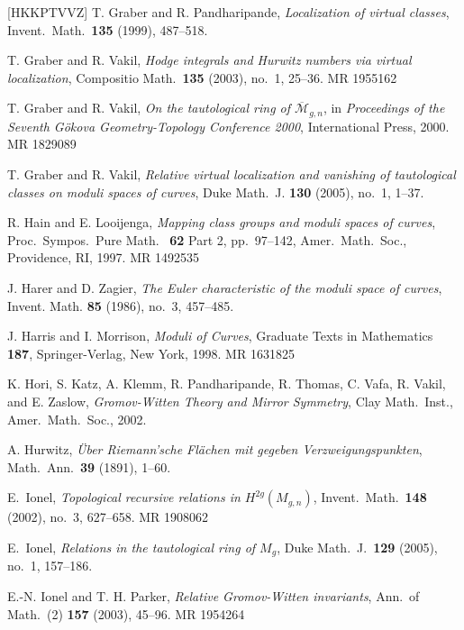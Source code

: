\documentclass[12pt,letterpaper]{amsart}
\newcommand{\cm}{{\mathcal{M}}}
\newcommand{\cmbar}{\overline{\cm}}
\newcommand{\cited}{}
\begin{document}
\begin{thebibliography}{[HKKPTVVZ]}
 T. Graber and R. Pandharipande, {\em Localization
of virtual classes}, Invent.\ Math.\ {\bf 135} (1999), 487--518.
\cited

 T. Graber and R. Vakil, {\em Hodge integrals and
Hurwitz numbers via virtual localization}, Compositio Math.\ {\bf 135}
(2003), no.\ 1, 25--36.  MR 1955162 \cited

 T. Graber and R. Vakil, {\em On the tautological
    ring of $\cmbar_{g,n}$}, in {\em Proceedings of the Seventh
    G\"okova Geometry-Topology Conference 2000}, International Press,
  2000.  MR 1829089

T. Graber and R. Vakil, {\em Relative
virtual localization and vanishing of tautological classes on
moduli spaces of curves}, Duke Math.\ J. {\bf 130} (2005), no.\ 1, 1--37.
\cited

 R. Hain and E. Looijenga, {\em Mapping class groups
    and moduli spaces of curves}, Proc.\ Sympos.\ Pure Math.\ {\bf
    62} Part 2, pp.\ 97--142, Amer.\ Math.\ Soc., Providence, RI, 1997. MR
  1492535 \cited

  J. Harer and D. Zagier, {\em The Euler
characteristic of the moduli space of curves}, Invent. Math. {\bf 85} (1986),
no.\ 3, 457--485.  \cited

  J. Harris and I. Morrison, {\em Moduli 
of Curves}, Graduate Texts in Mathematics {\bf 187}, Springer-Verlag, New 
York, 1998.  MR 1631825 \cited


 K. Hori, S. Katz, A. Klemm,
  R. Pandharipande, R. Thomas, C. Vafa, R. Vakil, and E. Zaslow, {\em
    Gromov-Witten Theory and Mirror Symmetry}, Clay Math.\ Inst., Amer.\
  Math.\ Soc., 2002. \cited

A. Hurwitz, {\em \"{U}ber Riemann'sche
Fl\"{a}chen mit gegeben Verzweigungspunkten}, Math.\ Ann.\ {\bf 39} (1891),
1--60.  \cited

 E.~Ionel, {\em Topological recursive relations
in $H^{2g}(M_{g,n})$}, Invent.\ Math.\ {\bf 148} (2002), no.\ 3,
627--658.  MR 1908062

 E.~Ionel, {\em Relations in the tautological ring
of $M_g$}, Duke Math.\ J.\ {\bf 129} (2005), no.\ 1, 157--186. \cited

 E.-N. Ionel and T. H. Parker, {\em Relative
Gromov-Witten invariants}, Ann.\ of Math.\ (2) {\bf 157} (2003),
45--96.  MR 1954264 \cited


\end{thebibliography}
\end{document}
